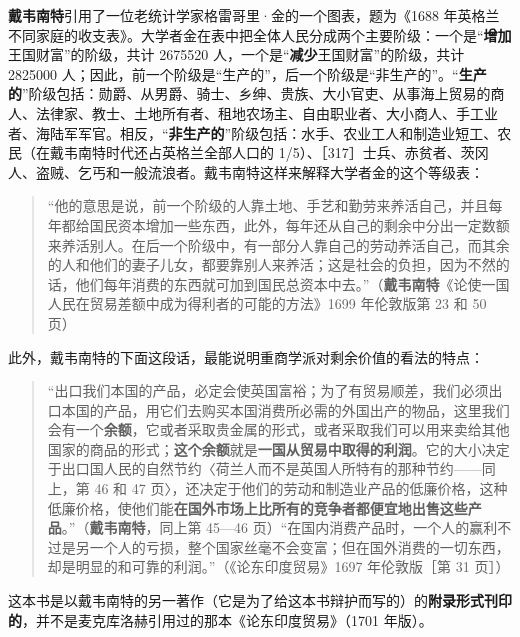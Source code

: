 
\textbf{戴韦南特}引用了一位老统计学家格雷哥里·金的一个图表，题为《1688 年英格兰不同家庭的收支表》。大学者金在表中把全体人民分成两个主要阶级：一个是“\textbf{增加}王国财富”的阶级，共计 2675520 人，一个是“\textbf{减少}王国财富”的阶级，共计 2825000 人；因此，前一个阶级是“生产的”，后一个阶级是“非生产的”。“\textbf{生产的}”阶级包括：勋爵、从男爵、骑士、乡绅、贵族、大小官吏、从事海上贸易的商人、法律家、教士、土地所有者、租地农场主、自由职业者、大小商人、手工业者、海陆军军官。相反，“\textbf{非生产的}”阶级包括：水手、农业工人和制造业短工、农民（在戴韦南特时代还占英格兰全部人口的 1/5）、［317］士兵、赤贫者、茨冈人、盗贼、乞丐和一般流浪者。戴韦南特这样来解释大学者金的这个等级表：

\begin{quote}“他的意思是说，前一个阶级的人靠土地、手艺和勤劳来养活自己，并且每年都给国民资本增加一些东西，此外，每年还从自己的剩余中分出一定数额来养活别人。在后一个阶级中，有一部分人靠自己的劳动养活自己，而其余的人和他们的妻子儿女，都要靠别人来养活；这是社会的负担，因为不然的话，他们每年消费的东西就可加到国民总资本中去。”（\textbf{戴韦南特}《论使一国人民在贸易差额中成为得利者的可能的方法》1699 年伦敦版第 23 和 50 页）\end{quote}

此外，戴韦南特的下面这段话，最能说明重商学派对剩余价值的看法的特点：

\begin{quote}“出口我们本国的产品，必定会使英国富裕；为了有贸易顺差，我们必须出口本国的产品，用它们去购买本国消费所必需的外国出产的物品，这里我们会有一个\textbf{余额}，它或者采取贵金属的形式，或者采取我们可以用来卖给其他国家的商品的形式；\textbf{这个余额}就是\textbf{一国从贸易中取得的利润}。它的大小决定于出口国人民的自然节约〈荷兰人而不是英国人所特有的那种节约——同上，第 46 和 47 页〉，还决定于他们的劳动和制造业产品的低廉价格，这种低廉价格，使他们能\textbf{在国外市场上比所有的竞争者都便宜地出售这些产品}。”（\textbf{戴韦南特}，同上第 45—46 页）\fontbox{~\{}“在国内消费产品时，一个人的赢利不过是另一个人的亏损，整个国家丝毫不会变富；但在国外消费的一切东西，却是明显的和可靠的利润。”（《论东印度贸易》1697 年伦敦版［第 31 页］）\fontbox{\}~}\end{quote}

\fontbox{~\{}这本书是以戴韦南特的另一著作（它是为了给这本书辩护而写的）的\textbf{附录形式刊印的}，并不是麦克库洛赫引用过的那本《论东印度贸易》（1701 年版）。\fontbox{\}~}

